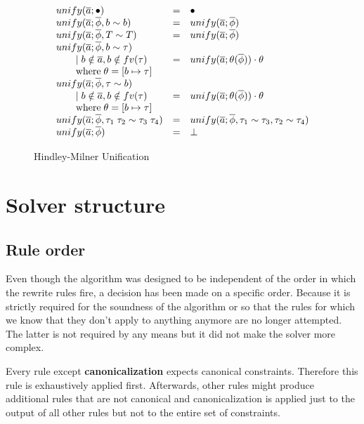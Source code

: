 \begin{figure}
\[
\begin{array}{l c l}
unify(\overline{a}; \bullet) &=& \bullet
\\
unify(\overline{a}; \overline{\phi}, b \sim b) &=& unify(\overline{a};
\overline{\phi})
\\
unify(\overline{a}; \overline{\phi}, T \sim T) &=& unify(\overline{a};
\overline{\phi})
\\
unify(\overline{a}; \overline{\phi}, b \sim \tau)
\\ \qquad \mid b \notin \overline{a}, b \notin fv(\tau) &=& unify(\overline{a};
\theta(\overline{\phi})) \cdot \theta
\\ \qquad \text{where} \; \theta = [b \mapsto \tau]
\\
unify(\overline{a}; \overline{\phi}, \tau \sim b)
\\ \qquad \mid b \notin \overline{a}, b \notin fv(\tau) &=& unify(\overline{a};
\theta(\overline{\phi})) \cdot \theta
\\ \qquad \text{where} \; \theta = [b \mapsto \tau]
\\
unify(\overline{a}; \overline{\phi}, \tau_1 \; \tau_2 \sim \tau_3 \; \tau_4) &=&
unify(\overline{a}; \overline{\phi}, \tau_1 \sim \tau_3, \tau_2 \sim \tau_4)
\\
unify(\overline{a}; \overline{\phi}) &=& \bot
\end{array}
\]
\caption{Hindley-Milner Unification}
\label{fig:unify}
\end{figure}

\newpage
\section{Solver structure}

\subsection{Rule order}
Even though the algorithm was designed to be independent of the order in which
the rewrite rules fire, a decision has been made on a specific order. Because it
is strictly required for the soundness of the algorithm or so that the rules for
which we know that they don't apply to anything anymore are no longer attempted.
The latter is not required by any means but it did not make the solver more
complex.

Every rule except \textbf{canonicalization} expects canonical
constraints. Therefore this rule is exhaustively applied first. Afterwards,
other rules might produce additional rules that are not canonical and
canonicalization is applied just to the output of all other rules but not to the
entire set of constraints.

